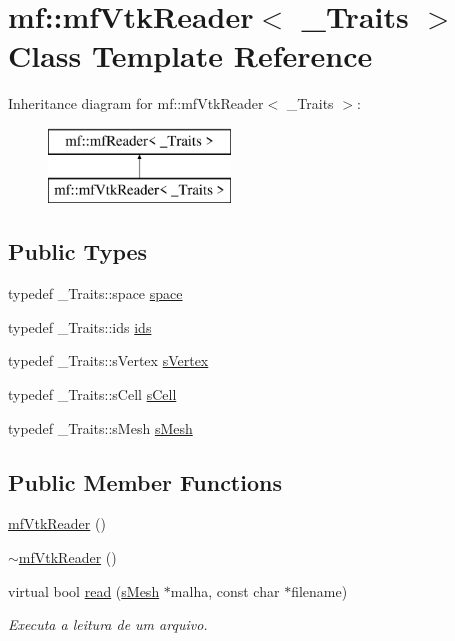 \hypertarget{classmf_1_1mfVtkReader}{
\section{mf::mfVtkReader$<$ \_\-Traits $>$ Class Template Reference}
\label{classmf_1_1mfVtkReader}
}
Inheritance diagram for mf::mfVtkReader$<$ \_\-Traits $>$:\begin{figure}[H]
\begin{center}
\leavevmode
\includegraphics[height=2.000000cm]{classmf_1_1mfVtkReader}
\end{center}
\end{figure}
\subsection*{Public Types}
\begin{DoxyCompactItemize}
\item 
typedef \_\-Traits::space \hyperlink{classmf_1_1mfVtkReader_a157b4bcf691cc34e5333e4ff0b8976ad}{space}
\item 
typedef \_\-Traits::ids \hyperlink{classmf_1_1mfVtkReader_ad563f3eceaac2a5928f9f2cca98d8a64}{ids}
\item 
typedef \_\-Traits::sVertex \hyperlink{classmf_1_1mfVtkReader_a953ce52269ccebd0abb7f15147de46b3}{sVertex}
\item 
typedef \_\-Traits::sCell \hyperlink{classmf_1_1mfVtkReader_aa5070471f8c7bbc67628f91022ca06c9}{sCell}
\item 
typedef \_\-Traits::sMesh \hyperlink{classmf_1_1mfVtkReader_a21c487f2b456bef55115cf06620a2f3b}{sMesh}
\end{DoxyCompactItemize}
\subsection*{Public Member Functions}
\begin{DoxyCompactItemize}
\item 
\hyperlink{classmf_1_1mfVtkReader_ad42ee66b44197472cdeab9adea56b90b}{mfVtkReader} ()
\item 
\hyperlink{classmf_1_1mfVtkReader_abd8f5f738472810d3ec93f38b10193eb}{$\sim$mfVtkReader} ()
\item 
virtual bool \hyperlink{classmf_1_1mfVtkReader_a3cbb607039dd5acf5aa0071f8ee49786}{read} (\hyperlink{classmf_1_1mfVtkReader_a21c487f2b456bef55115cf06620a2f3b}{sMesh} $\ast$malha, const char $\ast$filename)
\begin{DoxyCompactList}\small\item\em Executa a leitura de um arquivo. \item\end{DoxyCompactList}\end{DoxyCompactItemize}
